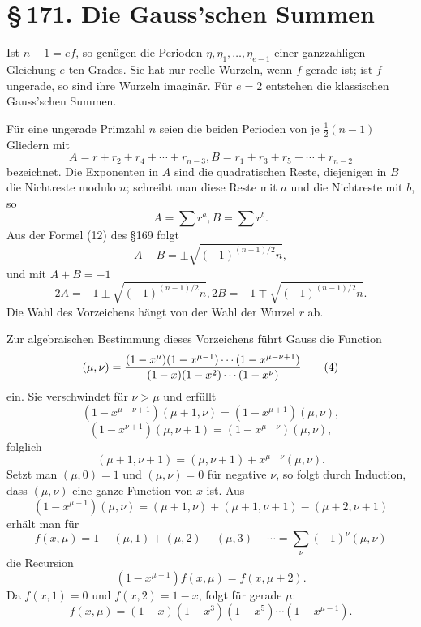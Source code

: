 \documentclass[11pt]{article}
\providecommand{\sect}[2]{\section*{\S\,#1. #2}}
\begin{document}
\sect{171}{Die Gauss'schen Summen}

Ist $n-1=ef$, so genügen die Perioden $\eta,
\eta_1,
\ldots,
\eta_{e-1}$ einer ganzzahligen Gleichung $e$-ten Grades. Sie hat nur reelle Wurzeln, wenn $f$ gerade ist; ist $f$ ungerade, so sind ihre Wurzeln imaginär. Für $e=2$ entstehen die klassischen Gauss'schen Summen.

Für eine ungerade Primzahl $n$ seien die beiden Perioden von je $\frac12(n-1)$ Gliedern mit
\[
        A=r+r_2+r_4+
\cdots+r_{n-3},
        B=r_1+r_3+r_5+
\cdots+r_{n-2}
\]
bezeichnet. Die Exponenten in $A$ sind die quadratischen Reste, diejenigen in $B$ die Nichtreste modulo $n$; schreibt man diese Reste mit $a$ und die Nichtreste mit $b$, so
\[
        A=\sum r^a,
        B=\sum r^b.                                                   \tag{1}
\]
Aus der Formel (12) des §169 folgt
\[
        A-B=\pm\sqrt{(-1)^{(n-1)/2}n},                                 \tag{2}
\]
und mit $A+B=-1$
\[
        2A=-1\pm\sqrt{(-1)^{(n-1)/2}n},
        2B=-1\mp\sqrt{(-1)^{(n-1)/2}n}.                                \tag{3}
\]
Die Wahl des Vorzeichens hängt von der Wahl der Wurzel $r$ ab.

Zur algebraischen Bestimmung dieses Vorzeichens führt Gauss die Function
\[
        (\mu,
\nu)=
        { (1-x^\mu)(1-x^{\mu-1})\cdots(1-x^{\mu-
\nu+1})
        \over
        (1-x)(1-x^2)\cdots(1-x^\nu)}                                  \tag{4}
\]
ein. Sie verschwindet für $\nu>\mu$ und erfüllt
\[
(1-x^{\mu-
\nu+1})(\mu+1,
\nu)=(1-x^{\mu+1})(\mu,
\nu),                 \tag{5}
\]
\[
(1-x^{\nu+1})(\mu,
\nu+1)=(1-x^{\mu-
\nu})(\mu,
\nu),                  \tag{6}
\]
folglich
\[
        (\mu+1,
\nu+1)=(\mu,
\nu+1)+x^{\mu-
\nu}(\mu,
\nu).            \tag{7}
\]
Setzt man $(\mu,0)=1$ und $(\mu,
\nu)=0$ für negative $\nu$, so folgt durch Induction, dass $(\mu,
\nu)$ eine ganze Function von $x$ ist. Aus
\[
        (1-x^{\mu+1})(\mu,
\nu)
        =(
\mu+1,
\nu)+(
\mu+1,
\nu+1)-(
\mu+2,
\nu+1)              \tag{8}
\]
erhält man für
\[
        f(x,
\mu)=1-(\mu,1)+(
\mu,2)-(
\mu,3)+\cdots
        =\sum_\nu(-1)^\nu(\mu,
\nu)                                      \tag{9}
\]
die Recursion
\[
        (1-x^{\mu+1})f(x,
\mu)=f(x,
\mu+2).                              \tag{10}
\]
Da $f(x,1)=0$ und $f(x,2)=1-x$, folgt für gerade $\mu$:
\[
        f(x,
\mu)=(1-x)(1-x^3)(1-x^5)\cdots(1-x^{\mu-1}).               \tag{11}
\]
\end{document}
